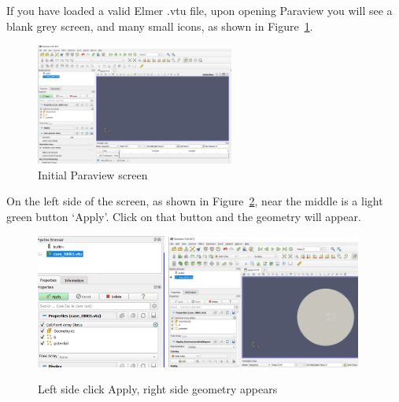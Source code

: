 If you have loaded a valid Elmer .vtu file, upon opening Paraview you will see a blank grey screen, and many small icons, as shown in Figure~\ref{fg:paraview-2}.

\begin{figure}[H]
\begin{center}
\includegraphics[width=0.58\textwidth]{paraview-2}
\caption{Initial Paraview screen}\label{fg:paraview-2}
\end{center}
\end{figure}

On the left side of the screen, as shown in Figure~\ref{fg:paraview-4}, near the middle is a light green button `Apply'.  Click on that button and the geometry will appear.

\begin{figure}[H]
\begin{center}
\includegraphics[width=0.38\textwidth]{paraview-3}
\includegraphics[width=0.57\textwidth]{paraview-4}
\caption{Left side click Apply, right side geometry appears}\label{fg:paraview-4}
\end{center}
\end{figure}

